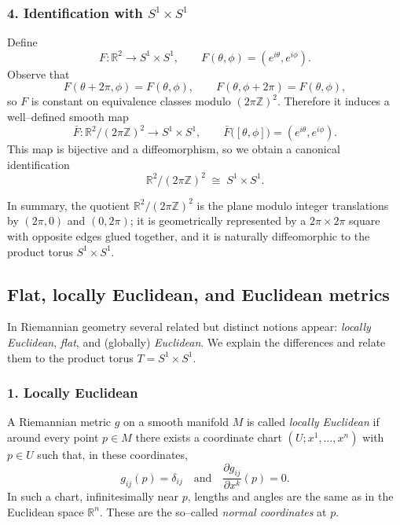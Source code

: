 \documentclass[12pt,a4paper]{article}
\theoremstyle{plain}
\theoremstyle{definition}      %
\begin{document}
\subsubsection*{4. Identification with $S^{1}\times S^{1}$}

Define
\[
F : \mathbb{R}^{2} \longrightarrow S^{1}\times S^{1},\qquad
F(\theta,\phi) = (e^{i\theta},e^{i\phi}).
\]
Observe that
\[
F(\theta+2\pi,\phi) = F(\theta,\phi),
\qquad
F(\theta,\phi+2\pi) = F(\theta,\phi),
\]
so $F$ is constant on equivalence classes modulo $(2\pi\mathbb{Z})^{2}$.
Therefore it induces a well--defined smooth map
\[
\bar F : \mathbb{R}^{2}/(2\pi\mathbb{Z})^{2} \longrightarrow S^{1}\times S^{1},
\qquad
\bar F\bigl([\theta,\phi]\bigr) = (e^{i\theta},e^{i\phi}).
\]
This map is bijective and a diffeomorphism, so we obtain a canonical
identification
\[
\mathbb{R}^{2}/(2\pi\mathbb{Z})^{2} \;\cong\; S^{1}\times S^{1}.
\]

In summary, the quotient $\mathbb{R}^{2}/(2\pi\mathbb{Z})^{2}$ is the
plane modulo integer translations by $(2\pi,0)$ and $(0,2\pi)$; it is
geometrically represented by a $2\pi\times 2\pi$ square with opposite
edges glued together, and it is naturally diffeomorphic to the product
torus $S^{1}\times S^{1}$.


\subsection*{Flat, locally Euclidean, and Euclidean metrics}

In Riemannian geometry several related but distinct notions appear:
\emph{locally Euclidean}, \emph{flat}, and (globally) \emph{Euclidean}.
We explain the differences and relate them to the product torus
$T = S^{1}\times S^{1}$.

\subsubsection*{1. Locally Euclidean}

A Riemannian metric $g$ on a smooth manifold $M$ is called
\emph{locally Euclidean} if around every point $p\in M$ there exists
a coordinate chart $(U;x^{1},\dots,x^{n})$ with $p\in U$ such that,
in these coordinates,
\[
g_{ij}(p) = \delta_{ij}
\quad\text{and}\quad
\frac{\partial g_{ij}}{\partial x^{k}}(p) = 0.
\]
In such a chart, infinitesimally near $p$, lengths and angles are the
same as in the Euclidean space $\mathbb{R}^{n}$.  These are the so--called
\emph{normal coordinates} at $p$.
\end{document}
